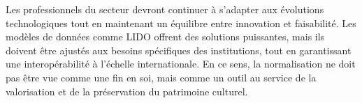 Les professionnels du secteur devront continuer à s’adapter aux évolutions technologiques tout en maintenant un équilibre entre innovation et faisabilité. Les modèles de données comme LIDO offrent des solutions puissantes, mais ils doivent être ajustés aux besoins spécifiques des institutions, tout en garantissant une interopérabilité à l’échelle internationale. En ce sens, la normalisation ne doit pas être vue comme une fin en soi, mais comme un outil au service de la valorisation et de la préservation du patrimoine culturel.
